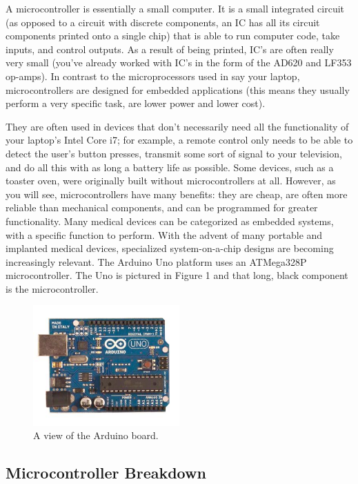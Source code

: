 \documentclass[10pt]{report}
\begin{document}
A microcontroller is essentially a small computer. It is a small integrated circuit (as opposed to a circuit with discrete components, an IC has all its circuit components printed onto a single chip) that is able to run computer code, take inputs, and control outputs. As a result of being printed, IC’s are often really very small (you’ve already worked with IC’s in the form of the AD620 and LF353 op-amps). In contrast to the microprocessors used in say your laptop, microcontrollers are designed for embedded applications (this means they usually perform a very specific task, are lower power and lower cost). 
\par
They are often used in devices that don’t necessarily need all the functionality of your laptop’s Intel Core i7; for example, a remote control only needs to be able to detect the user’s button presses, transmit some sort of signal to your television, and do all this with as long a battery life as possible. Some devices, such as a toaster oven, were originally built without microcontrollers at all. However, as you will see, microcontrollers have many benefits: they are cheap, are often more reliable than mechanical components, and can be programmed for greater functionality. Many medical devices can be categorized as embedded systems, with a specific function to perform. With the advent of many portable and implanted medical devices, specialized system-on-a-chip designs are becoming increasingly relevant. The Arduino Uno platform uses an ATMega328P microcontroller. The Uno is pictured in Figure 1 and that long, black component is the microcontroller.

\begin{figure}[H]
\centering
   \includegraphics[width=0.5\textwidth]{arduino.jpg}
    \caption{A view of the Arduino board.}
\end{figure}

\subsection*{Microcontroller Breakdown}
\end{document}
